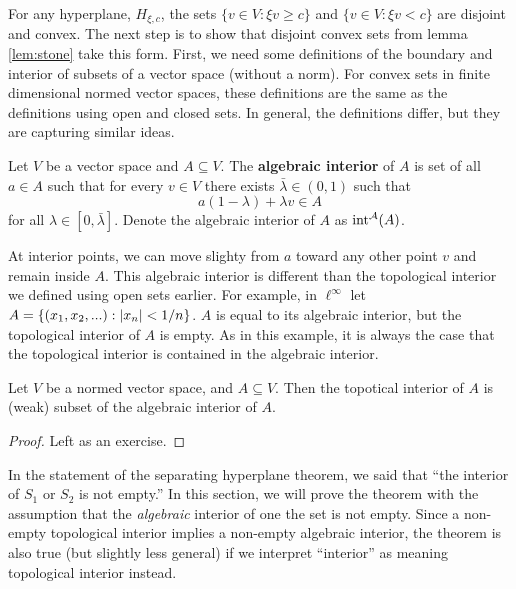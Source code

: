 For any hyperplane, $H_{\xi,c}$, the sets $\{v \in V: \xi v \geq c\}$
and $\{v \in V: \xi v < c\}$ are disjoint and convex. The next step is
to show that disjoint convex sets from lemma \ref{lem:stone} take this
form. First, we need some definitions of the boundary and interior of
subsets of a vector space (without a norm). For convex sets in finite
dimensional normed vector spaces, these definitions are the same as
the definitions using open and closed sets. In general, the
definitions differ, but they are capturing similar ideas. 
\begin{definition}
  Let $V$ be a vector space and $A \subseteq V$. The \textbf{algebraic
    interior} of $A$ is set of all $a \in A$ such that for every $v
  \in V$ there exists $\bar{\lambda} \in (0,1)$ such that 
  \[ a(1-\lambda) + \lambda v \in A \]
  for all $\lambda \in [0,\bar{\lambda}]$. Denote the algebraic
  interior of $A$ as ${\mathrm{int}}^{\mathcal{A}}({A})$.
\end{definition}
At interior points, we can move slighty from $a$ toward any other
point $v$ and remain inside $A$. This algebraic interior is different
than the topological interior we defined using open sets earlier. For
example, in $\ell^\infty$ let $A = \{(x_1, x_2, ...) : \left\vert {x_n} \right\vert <
1/n \}$. $A$ is equal to its algebraic interior, but the topological
interior of $A$ is empty. As in this example, it is always the case
that the topological interior is contained in the algebraic interior.
\begin{lemma}
  Let $V$ be a normed vector space, and $A \subseteq V$. Then the
  topotical interior of $A$ is (weak) subset of the algebraic interior
  of $A$.
\end{lemma}
\begin{proof}
  Left as an exercise.
\end{proof}
In the statement of the separating hyperplane theorem, we said that
``the interior of $S_1$ or $S_2$ is not empty.'' In this section, we
will prove the theorem with the assumption that the \emph{algebraic}
interior of one the set is not empty. Since a non-empty topological
interior implies a non-empty algebraic interior, the theorem is also
true (but slightly less general) if we interpret ``interior'' as meaning
topological interior instead.

